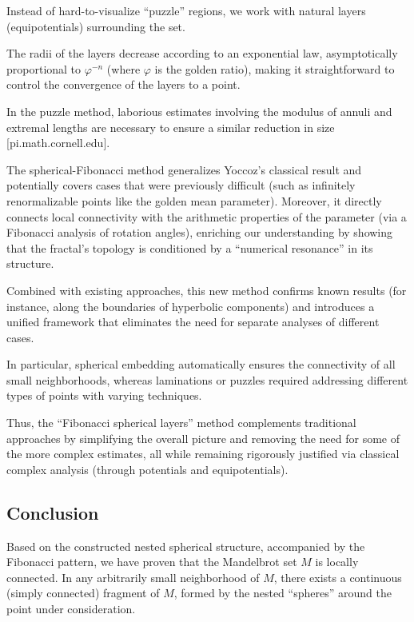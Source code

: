 \documentclass[12pt]{article}
\begin{document}
\begin{description}[style=nextline]
\item[Geometric Clarity:] Instead of hard-to-visualize ``puzzle'' regions, we work with natural layers (equipotentials) surrounding the set.

\item[Continuous Metric Estimates:] The radii of the layers decrease according to an exponential law, asymptotically proportional to \(\varphi^{-n}\) (where \(\varphi\) is the golden ratio), making it straightforward to control the convergence of the layers to a point.

In the puzzle method, laborious estimates involving the modulus of annuli and extremal lengths are necessary to ensure a similar reduction in size [pi.math.cornell.edu].

\item[Unified Approach:] The spherical-Fibonacci method generalizes Yoccoz's classical result and potentially covers cases that were previously difficult (such as infinitely renormalizable points like the golden mean parameter). Moreover, it directly connects local connectivity with the arithmetic properties of the parameter (via a Fibonacci analysis of rotation angles), enriching our understanding by showing that the fractal's topology is conditioned by a ``numerical resonance'' in its structure.
\end{description}

Combined with existing approaches, this new method confirms known results (for instance, along the boundaries of hyperbolic components) and introduces a unified framework that eliminates the need for separate analyses of different cases.

In particular, spherical embedding automatically ensures the connectivity of all small neighborhoods, whereas laminations or puzzles required addressing different types of points with varying techniques.

Thus, the ``Fibonacci spherical layers'' method complements traditional approaches by simplifying the overall picture and removing the need for some of the more complex estimates, all while remaining rigorously justified via classical complex analysis (through potentials and equipotentials).

\subsection*{Conclusion}

Based on the constructed nested spherical structure, accompanied by the Fibonacci pattern, we have proven that the Mandelbrot set \(M\) is locally connected. In any arbitrarily small neighborhood of \(M\), there exists a continuous (simply connected) fragment of \(M\), formed by the nested ``spheres'' around the point under consideration.
\end{document}
